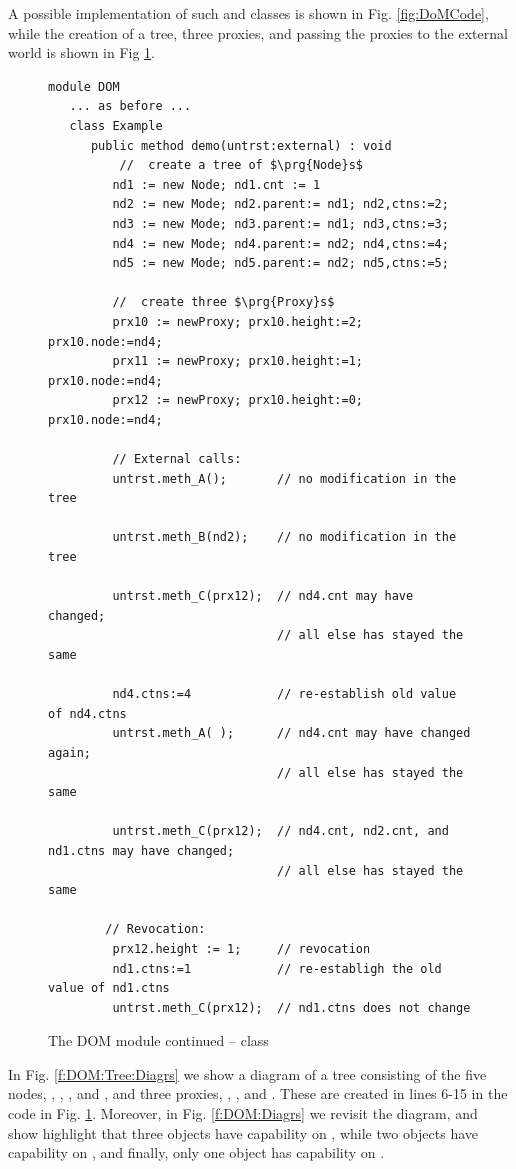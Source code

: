 A possible implementation of such  and  classes is shown in Fig.  \ref{fig:DoMCode}, 
while the creation of a tree, three proxies, and  passing the proxies to the external world is shown in Fig \ref{fig:DoMCodeClient}.




\begin{figure}[tbh]
\begin{lstlisting}[language = Chainmail, mathescape=true, frame=lines]
module DOM 
   ... as before ...
   class Example
      public method demo(untrst:external) : void 
          //  create a tree of $\prg{Node}s$
         nd1 := new Node; nd1.cnt := 1
         nd2 := new Mode; nd2.parent:= nd1; nd2,ctns:=2;
         nd3 := new Mode; nd3.parent:= nd1; nd3,ctns:=3;
         nd4 := new Mode; nd4.parent:= nd2; nd4,ctns:=4;
         nd5 := new Mode; nd5.parent:= nd2; nd5,ctns:=5;
         
         //  create three $\prg{Proxy}s$
         prx10 := newProxy; prx10.height:=2; prx10.node:=nd4;
         prx11 := newProxy; prx10.height:=1; prx10.node:=nd4; 
         prx12 := newProxy; prx10.height:=0; prx10.node:=nd4;
          
         // External calls:         
         untrst.meth_A();       // no modification in the tree
         
         untrst.meth_B(nd2);    // no modification in the tree     
         
         untrst.meth_C(prx12);  // nd4.cnt may have changed; 
                                // all else has stayed the same
         
         nd4.ctns:=4            // re-establish old value of nd4.ctns
         untrst.meth_A( );      // nd4.cnt may have changed again; 
                                // all else has stayed the same
         
         untrst.meth_C(prx12);  // nd4.cnt, nd2.cnt, and nd1.ctns may have changed; 
                                // all else has stayed the same
      
        // Revocation:
         prx12.height := 1;     // revocation
         nd1.ctns:=1            // re-establigh the old value of nd1.ctns
         untrst.meth_C(prx12);  // nd1.ctns does not change     
\end{lstlisting}
\caption{The DOM module continued -- class  }
\label{fig:DoMCodeClient}
\end{figure}
In Fig. \ref{f:DOM:Tree:Diagrs}  we show a diagram of  a tree consisting of the five nodes, , ,  ,  and , 
and three proxies, , ,  and . These are created in lines 6-15 in the code in Fig. \ref{fig:DoMCodeClient}.
Moreover, in Fig. \ref{f:DOM:Diagrs}  we revisit the diagram, and show highlight that three objects have capability on ,
while two objects have capability on , and finally, only one object has capability on  .

